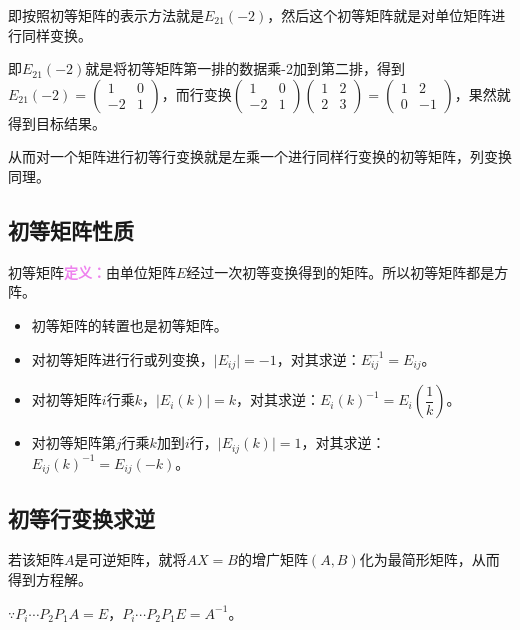 \documentclass[UTF8, 12pt]{ctexart}
\begin{document}
即按照初等矩阵的表示方法就是$E_{21}(-2)$，然后这个初等矩阵就是对单位矩阵进行同样变换。

即$E_{21}(-2)$就是将初等矩阵第一排的数据乘-2加到第二排，得到$E_{21}(-2)=\left(\begin{array}{cc}
    1 & 0 \\
    -2 & 1
\end{array}\right)$，而行变换$\left(\begin{array}{cc}
    1 & 0 \\
    -2 & 1
\end{array}\right)\left(\begin{array}{cc}
    1 & 2 \\
    2 & 3
\end{array}\right)=\left(\begin{array}{cc}
    1 & 2 \\
    0 & -1
\end{array}\right)$，果然就得到目标结果。

从而对一个矩阵进行初等行变换就是左乘一个进行同样行变换的初等矩阵，列变换同理。

\subsection{初等矩阵性质}

初等矩阵\textcolor{violet}{\textbf{定义：}}由单位矩阵$E$经过一次初等变换得到的矩阵。所以初等矩阵都是方阵。

\begin{itemize}
    \item 初等矩阵的转置也是初等矩阵。
    \item 对初等矩阵进行行或列变换，$\vert E_{ij}\vert=-1$，对其求逆：$E_{ij}^{-1}=E_{ij}$。
    \item 对初等矩阵$i$行乘$k$，$\vert E_i(k)\vert=k$，对其求逆：$E_i(k)^{-1}=E_i\left(\dfrac{1}{k}\right)$。
    \item 对初等矩阵第$j$行乘$k$加到$i$行，$\vert E_{ij}(k)\vert=1$，对其求逆：$E_{ij}(k)^{-1}=E_{ij}(-k)$。
\end{itemize}

\subsection{初等行变换求逆}

若该矩阵$A$是可逆矩阵，就将$AX=B$的增广矩阵$(A,B)$化为最简形矩阵，从而得到方程解。\medskip

$\because P_i\cdots P_2P_1A=E$，$P_i\cdots P_2P_1E=A^{-1}$。
\end{document}
